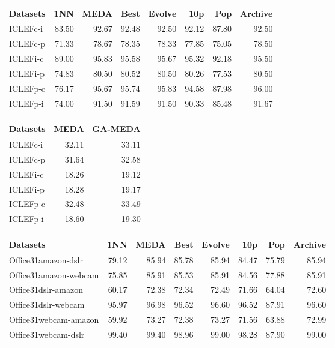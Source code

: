 \documentclass[a4paper]{article}
\begin{document}
	\begin{tabular}{lrrrrrrr}
		\toprule
		Datasets &    1NN &   MEDA &   Best &  Evolve &    10p &    Pop &  Archive \\
		\midrule
		ICLEFc-i &  83.50 &  92.67 &  92.48 &   92.50 &  92.12 &  87.80 &    92.50 \\
		ICLEFc-p &  71.33 &  78.67 &  78.35 &   78.33 &  77.85 &  75.05 &    78.50 \\
		ICLEFi-c &  89.00 &  95.83 &  95.58 &   95.67 &  95.32 &  92.18 &    95.50 \\
		ICLEFi-p &  74.83 &  80.50 &  80.52 &   80.50 &  80.26 &  77.53 &    80.50 \\
		ICLEFp-c &  76.17 &  95.67 &  95.74 &   95.83 &  94.58 &  87.98 &    96.00 \\
		ICLEFp-i &  74.00 &  91.50 &  91.59 &   91.50 &  90.33 &  85.48 &    91.67 \\
		\bottomrule
	\end{tabular}
	
	\begin{tabular}{lrr}
		\toprule
		Datasets &   MEDA &  GA-MEDA \\
		\midrule
		ICLEFc-i &  32.11 &    33.11 \\
		ICLEFc-p &  31.64 &    32.58 \\
		ICLEFi-c &  18.26 &    19.12 \\
		ICLEFi-p &  18.28 &    19.17 \\
		ICLEFp-c &  32.48 &    33.49 \\
		ICLEFp-i &  18.60 &    19.30 \\
		\bottomrule
	\end{tabular}
	
	\begin{tabular}{lrrrrrrr}
		\toprule
		Datasets &    1NN &   MEDA &   Best &  Evolve &    10p &    Pop &  Archive \\
		\midrule
		Office31amazon-dslr &  79.12 &  85.94 &  85.78 &   85.94 &  84.47 &  75.79 &    85.94 \\
		Office31amazon-webcam &  75.85 &  85.91 &  85.53 &   85.91 &  84.56 &  77.88 &    85.91 \\
		Office31dslr-amazon &  60.17 &  72.38 &  72.34 &   72.49 &  71.66 &  64.04 &    72.60 \\
		Office31dslr-webcam &  95.97 &  96.98 &  96.52 &   96.60 &  96.52 &  87.91 &    96.60 \\
		Office31webcam-amazon &  59.92 &  73.27 &  72.38 &   73.27 &  71.56 &  63.88 &    72.99 \\
		Office31webcam-dslr &  99.40 &  99.40 &  98.96 &   99.00 &  98.28 &  87.90 &    99.00 \\
		\bottomrule
	\end{tabular}
	
\end{document}
